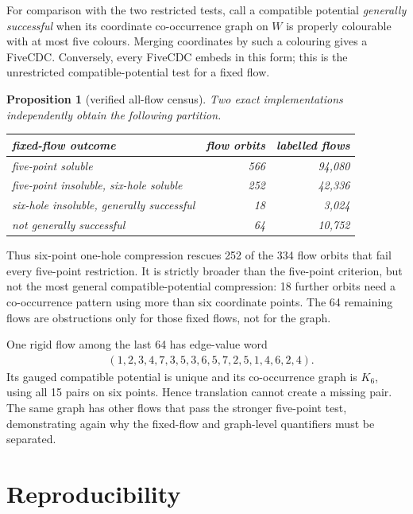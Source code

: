 \documentclass[11pt]{article}
\newtheorem{proposition}[theorem]{Proposition}
\theoremstyle{definition}
\theoremstyle{remark}
\newcommand{\FiveCDC}{\textup{FiveCDC}}
\numberwithin{equation}{section}
\begin{document}
For comparison with the two restricted tests, call a compatible
potential \emph{generally successful} when its coordinate co-occurrence
graph on \(W\) is properly colourable with at most five colours.  Merging
coordinates by such a colouring gives a \FiveCDC.  Conversely, every
\FiveCDC{} embeds in this form; this is the unrestricted compatible-potential
test for a fixed flow.

\begin{proposition}[verified all-flow census]
\label{prop:census}
Two exact implementations independently obtain the following partition.
\begin{center}
\begin{tabular}{@{}lrr@{}}
\toprule
fixed-flow outcome & flow orbits & labelled flows\\
\midrule
five-point soluble & 566 & 94,080\\
five-point insoluble, six-hole soluble & 252 & 42,336\\
six-hole insoluble, generally successful & 18 & 3,024\\
not generally successful & 64 & 10,752\\
\bottomrule
\end{tabular}
\end{center}
\end{proposition}

Thus six-point one-hole compression rescues 252 of the 334 flow orbits
that fail every five-point restriction.  It is strictly broader than the
five-point criterion, but not the most general compatible-potential
compression: 18 further orbits need a co-occurrence pattern using more
than six coordinate points.  The 64 remaining flows are obstructions only
for those fixed flows, not for the graph.

One rigid flow among the last 64 has edge-value word
\[
\begin{split}
 &(1,2,3,4,7,3,5,3,6,5,7,2,5,1,4,6,2,4).
\end{split}
\]
Its gauged compatible potential is unique and its co-occurrence graph is
\(K_6\), using all 15 pairs on six points.  Hence translation cannot
create a missing pair.  The same graph has other flows that pass the
stronger five-point test, demonstrating again why the fixed-flow and
graph-level quantifiers must be separated.

\section{Reproducibility}
\end{document}
